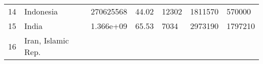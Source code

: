 \documentclass[
]{article}
\begin{document}
\begin{longtable}[]{@{}lllllll@{}}
\begin{minipage}[t]{0.06\columnwidth}\raggedright
14\strut
\end{minipage} & \begin{minipage}[t]{0.15\columnwidth}\raggedright
Indonesia\strut
\end{minipage} & \begin{minipage}[t]{0.13\columnwidth}\raggedright
270625568\strut
\end{minipage} & \begin{minipage}[t]{0.13\columnwidth}\raggedright
44.02\strut
\end{minipage} & \begin{minipage}[t]{0.09\columnwidth}\raggedright
12302\strut
\end{minipage} & \begin{minipage}[t]{0.12\columnwidth}\raggedright
1811570\strut
\end{minipage} & \begin{minipage}[t]{0.12\columnwidth}\raggedright
570000\strut
\end{minipage}\tabularnewline
\begin{minipage}[t]{0.06\columnwidth}\raggedright
15\strut
\end{minipage} & \begin{minipage}[t]{0.15\columnwidth}\raggedright
India\strut
\end{minipage} & \begin{minipage}[t]{0.13\columnwidth}\raggedright
1.366e+09\strut
\end{minipage} & \begin{minipage}[t]{0.13\columnwidth}\raggedright
65.53\strut
\end{minipage} & \begin{minipage}[t]{0.09\columnwidth}\raggedright
7034\strut
\end{minipage} & \begin{minipage}[t]{0.12\columnwidth}\raggedright
2973190\strut
\end{minipage} & \begin{minipage}[t]{0.12\columnwidth}\raggedright
1797210\strut
\end{minipage}\tabularnewline
\begin{minipage}[t]{0.06\columnwidth}\raggedright
16\strut
\end{minipage} & \begin{minipage}[t]{0.15\columnwidth}\raggedright
Iran, Islamic Rep.\strut
\end{minipage} & \begin{minipage}[t]{0.13\columnwidth}\raggedright

\end{minipage}
\end{longtable}
\end{document}
